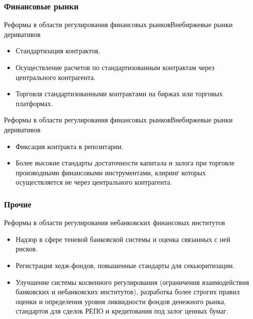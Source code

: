 \documentclass[_Banking_p1.tex]{subfiles}
\begin{document}
\subsubsection{Финансовые рынки}
\begin{frame} {Реформы в области регулирования финансовых рынков}{Внебиржевые рынки деривативов}
\begin{itemize}[<+->]

\item
Стандартизация контрактов. 

\item
Осуществление расчетов по стандартизованным контрактам через центрального контрагента.

\item
Торговля стандартизованными контрактами на биржах или торговых платформах.
\end{itemize}

\end{frame}

\begin{frame} {Реформы в области регулирования финансовых рынков}{Внебиржевые рынки деривативов}
\begin{itemize}[<+->]
\item
Фиксация контракта в репозитарии.

\item
Более высокие стандарты достаточности капитала и залога при торговле производными финансовыми инструментами, клиринг которых осуществляется не через центрального контрагента.
\end{itemize}

\end{frame}


\subsubsection{Прочие}
\begin{frame}{\setfontsize{16pt} Реформы в области регулирования небанковских финансовых институтов}
\begin{itemize}[<+->]
\item
Надзор в сфере теневой банковской системы и оценка связанных с ней рисков.

\item
Регистрация хедж-фондов, повышенные стандарты для секьюритизации.

\item
Улучшение системы косвенного регулирования (ограничения взаимодействия банковских и небанковских институтов), разработка более строгих правил оценки и определения уровня ликвидности фондов денежного рынка, стандартов для сделок РЕПО и кредитования под залог ценных бумаг.

\end{itemize}

\end{frame}
\end{document}

